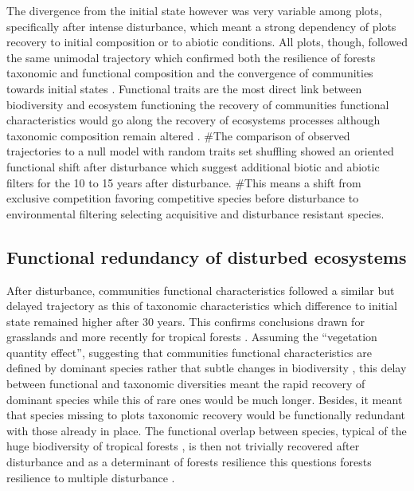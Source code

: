 \documentclass[fleqn,10pt]{ArtEcoFoG} %
\theoremstyle{definition}
\theoremstyle{definition}
\theoremstyle{definition}
\theoremstyle{remark}
\begin{document}
The divergence from the initial state however was very variable among
plots, specifically after intense disturbance, which meant a strong
dependency of plots recovery to initial composition or to abiotic
conditions. All plots, though, followed the same unimodal trajectory
which confirmed both the resilience of forests taxonomic and functional
composition and the convergence of communities towards initial states
\citep{Hubbell1999, Molino2001, Baraloto2012a}. Functional traits are
the most direct link between biodiversity and ecosystem functioning
\citep{Diaz2005} the recovery of communities functional characteristics
would go along the recovery of ecosystems processes although taxonomic
composition remain altered \citep{Guariguata2001}. \#The comparison of
observed trajectories to a null model with random traits set shuffling
showed an oriented functional shift after disturbance which suggest
additional biotic and abiotic filters for the 10 to 15 years after
disturbance. \#This means a shift from exclusive competition favoring
competitive species before disturbance to environmental filtering
selecting acquisitive and disturbance resistant species.

\subsection{Functional redundancy of disturbed
ecosystems}\label{functional-redundancy-of-disturbed-ecosystems}

After disturbance, communities functional characteristics followed a
similar but delayed trajectory as this of taxonomic characteristics
which difference to initial state remained higher after 30 years. This
confirms conclusions drawn for grasslands
\citep{Tilman1997, Mouillot2011} and more recently for tropical forests
\citep{Lohbeck2015, Guariguata2001}. Assuming the ``vegetation quantity
effect'', suggesting that communities functional characteristics are
defined by dominant species rather that subtle changes in biodiversity
\citep{Grime1998}, this delay between functional and taxonomic
diversities meant the rapid recovery of dominant species while this of
rare ones would be much longer. Besides, it meant that species missing
to plots taxonomic recovery would be functionally redundant with those
already in place. The functional overlap between species, typical of the
huge biodiversity of tropical forests \citep{Bellwood2006}, is then not
trivially recovered after disturbance and as a determinant of forests
resilience this questions forests resilience to multiple disturbance
\citep{Trenbath1999, Elmqvist2003, Diaz2005}.
\end{document}
